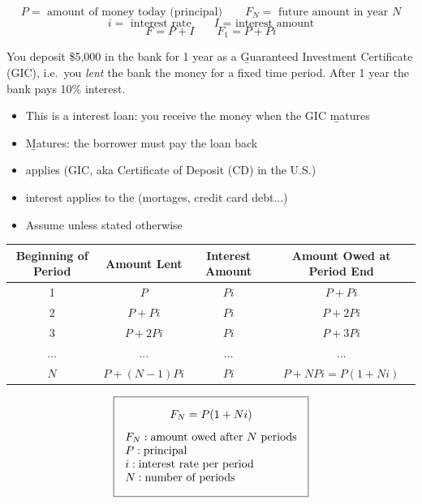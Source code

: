 
\[P = \text{ amount of money today (principal)} \qquad F_N = \text{ future amount in year }N\]
\[i = \text{ interest rate} \qquad I\text{ = interest amount}\]
\[F = P+I \qquad F_1 = P+Pi\]

\begin{example}[GIC]
    You deposit \$5,000 in the bank for 1 year as a \b{Guaranteed Investment Certificate (GIC)}, i.e.\ you \textit{lent} the bank the money for a fixed time period. After 1 year the bank pays 10\% interest.
    \\
    \begin{itemize}
        \item This is a  interest loan: you receive the money when the GIC \b{matures}
        \item \b{Matures}: the borrower must pay the loan back
    \end{itemize}
\end{example}

\begin{itemize}
    \item {} applies  (GIC, aka Certificate of Deposit (CD) in the U.S.)
    \item {} interest applies to the  (mortages, credit card debt...)
    \item Assume  unless stated otherwise
\end{itemize}

\begin{tabular}{c|c|c|c}
    Beginning of Period & Amount Lent & Interest Amount & Amount Owed at Period End \\\hline
    1 & $P$ & $Pi$ & $P+Pi$ \\
    2 & $P+Pi$ & $Pi$ & $P+2Pi$ \\
    3 & $P+2Pi$ & $Pi$ & $P+3Pi$ \\
    ... & ... & ... & ... \\
    $N$ & $P+(N-1)Pi$ & $Pi$ & $P+NPi = P(1+Ni)$
\end{tabular}
\[\boxed{\begin{gathered}
    F_N = P(1+Ni)\\[4pt]
    \begin{array}{@{}l@{}}
        F_N: \text{amount owed after } N \text{ periods}\\
        P: \text{principal}\\
        i: \text{interest rate per period}\\
        N: \text{number of periods}
    \end{array}
\end{gathered}}\]

